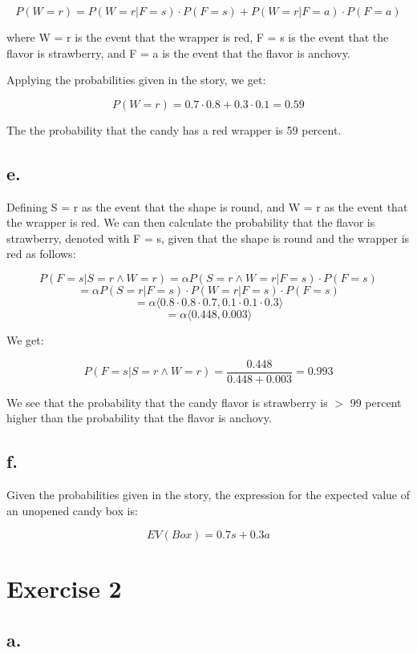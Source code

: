 \documentclass{article}
\begin{document}
\[P(W = r) = P(W = r | F = s) \cdot P(F = s) + P(W = r | F = a) \cdot P(F = a)\]

where W = r is the event that the wrapper is red, F = s is the event that the flavor is strawberry, and F = a is the event that the flavor is anchovy.

Applying the probabilities given in the story, we get:

\[P(W = r) = 0.7 \cdot 0.8 + 0.3 \cdot 0.1 = 0.59\]

The the probability that the candy has a red wrapper is 59 percent.


\subsection*{e.}

Defining S = r as the event that the shape is round, and W = r as the event that the wrapper is red. We can then calculate the probability that the flavor is strawberry, denoted with F = s, given that the shape is round and the wrapper is red as follows:

\[P(F = s | S = r \wedge W = r) = \alpha P(S = r \wedge W = r | F = s) \cdot P(F = s)\]
\[= \alpha P(S = r | F = s) \cdot P(W = r | F = s) \cdot P(F = s)\]
\[= \alpha \langle 0.8 \cdot 0.8 \cdot 0.7, 0.1 \cdot 0.1 \cdot 0.3 \rangle \]
\[= \alpha \langle 0.448, 0.003 \rangle\]

We get:

\[P(F = s | S = r \wedge W = r) = \dfrac{0.448}{0.448 + 0.003} = 0.993\]

We see that the probability that the candy flavor is strawberry is \(>\) 99 percent higher than the probability that the flavor is anchovy.

\subsection*{f.}

Given the probabilities given in the story, the expression for the expected value of an unopened candy box is:

\[EV(Box) = 0.7s + 0.3a\]


\section*{Exercise 2}

\subsection*{a.}
\end{document}
